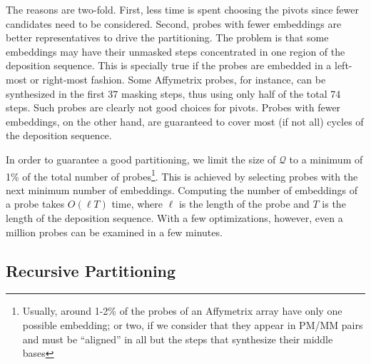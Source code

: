 \documentclass{llncs}
\begin{document}
The reasons are two-fold. First, less time is spent choosing the pivots since
fewer candidates need to be considered.  Second, probes with fewer embeddings
are better representatives to drive the partitioning. The problem is that some
embeddings may have their unmasked steps concentrated in one region of the
deposition sequence. This is specially true if the probes are embedded in a
left-most or right-most fashion.  Some Affymetrix probes, for instance, can be
synthesized in the first 37 masking steps, thus using only half of the total
74 steps. Such probes are clearly not good choices for pivots. Probes with
fewer embeddings, on the other hand, are guaranteed to cover most (if not all)
cycles of the deposition sequence.

In order to guarantee a good partitioning, we limit the size of $\mathcal{Q}$
to a minimum of 1\% of the total number of probes\footnote{Usually, around
  1-2\% of the probes of an Affymetrix array have only one possible embedding;
  or two, if we consider that they appear in PM/MM pairs and must be
  ``aligned'' in all but the steps that synthesize their middle bases}. This
is achieved by selecting probes with the next minimum number of embeddings.
Computing the number of embeddings of a probe takes $O(\ell T)$ time, where
$\ell$ is the length of the probe and $T$ is the length of the deposition
sequence.  With a few optimizations, however, even a million probes can be
examined in a few minutes.

\subsection{Recursive Partitioning}
\end{document}
